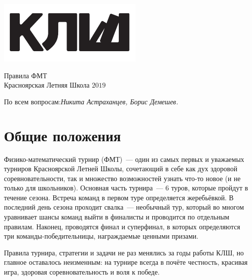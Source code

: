 \documentclass[12pt]{article}
\begin{document}
\begin{flushleft}
\parbox[t][0pt]{0.2\textwidth}
{
{%
\vspace{0\baselineskip}
\includegraphics[scale=1.5]{klsh_logo_mod.pdf}\par
}
}
\end{flushleft}
\hfill
\parbox[t][0pt]{0.80\textwidth}
{
{\centering
\vspace{-1.5\baselineskip}
\begin{flushright}
{\Huge Правила ФМТ}\\
{Красноярская Летняя Школа $2019$}\par
По всем вопросам:{\it  Никита Астраханцев, Борис Демешев.}
\end{flushright}
}
}
\vspace{4\baselineskip}

\section*{Общие положения}
Физико-математический турнир (ФМТ)~--- один из самых первых и уважаемых турниров Красноярской Летней Школы, сочетающий в себе как дух здоровой соревновательности, так и множество возможностей узнать что-то новое (и не только для школьников). Основная часть турнира~--- 6 туров, которые пройдут в течение сезона. Встреча команд в первом туре определяется жеребьёвкой. В последний день сезона проходит свалка~--- необычный тур, который во многом уравнивает шансы команд выйти в финалисты и проводится по отдельным правилам. Наконец, проводятся финал и суперфинал, в которых определяются три команды-победительницы, награждаемые ценными призами.

Правила турнира, стратегии и задачи не раз менялись за годы работы КЛШ, но главное оставалось неизменным: на турнире всегда в почёте честность, красивая игра, здоровая соревновательность и воля к победе.
\end{document}
